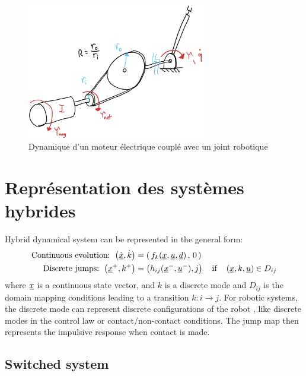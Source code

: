 \begin{figure}[ht]
	\centering
		\includegraphics[width=0.70\textwidth]{fig/actuator_dynamic.jpg}
	\caption{Dynamique d'un moteur électrique couplé avec un joint robotique}%
	\label{fig:actuator_dynamic}
\end{figure}


\newpage
\section{Représentation des systèmes hybrides}


Hybrid dynamical system can be represented in the general form:
%
\begin{align}
\text{Continuous evolution: } \left(  \dot{\underline{x}} , \dot{k} \right) &=  \left( \, f_k( \underline{x} , \underline{u} , \underline{d} ) \, , \, 0 \, \right) \\
\text{Discrete jumps: } \left(  \underline{x}^+ , k^+ \right) &=  \left( h_{ij}( \underline{x}^- , \underline{u}^- ) , j \right) \quad\text{if}\quad \left(  \underline{x} , k , \underline{u} \right) \in D_{ij}  
\end{align}
%
where $\underline{x}$ is a continuous state vector, and $k$ is a discrete mode and $D_{ij}$ is the domain mapping conditions leading to a transition $k:i \rightarrow j$. For robotic systems, the discrete mode can represent discrete configurations of the robot , like discrete modes in the control law or contact/non-contact conditions. The jump map then represents the impulsive response when contact is made. 

\subsection{Switched system}

